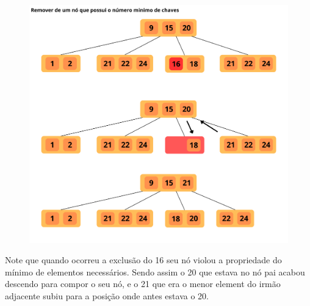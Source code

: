 \begin{figure}[H]
	\centering
	\includegraphics[scale=0.2]{figures/remocao2.png}
\end{figure}

Note que quando ocorreu a exclusão do 16 seu nó violou a propriedade do mínimo de elementos necessários. Sendo assim o 20 que estava no nó pai acabou descendo para compor o seu nó, e o 21 que era o menor element do irmão adjacente subiu para a posição onde antes estava o 20.
%
